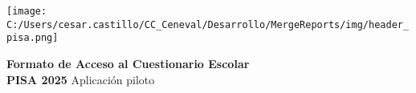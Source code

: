 \documentclass{letter}
\begin{document}

\begin{center}
    
\texttt{[image: C:/Users/cesar.castillo/CC\_Ceneval/Desarrollo/MergeReports/img/header\_pisa.png]}

\vspace{3\baselineskip}
\textbf{{\LARGE Formato de Acceso al Cuestionario Escolar}} \\
\vspace{.5\baselineskip}
{\LARGE \textbf{PISA 2025} Aplicación piloto}


\end{center}
\end{document}

